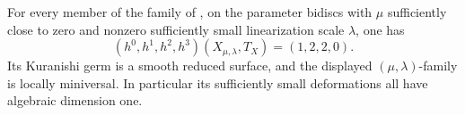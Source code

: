 \begin{proposition}\hypertarget{tag-01GK}{}\label{cdp:st:E13}

For every member of the family of
\cite[Proposition labelled \texttt{family}]{Viaclovsky2026Two}, on the parameter
bidiscs with $\mu$ sufficiently close to zero and nonzero sufficiently
small linearization scale $\lambda$, one has
\[
 (h^0,h^1,h^2,h^3)(X_{\mu,\lambda},T_X)=(1,2,2,0).
\]
Its Kuranishi germ is a smooth reduced surface, and the displayed
$(\mu,\lambda)$-family is locally miniversal. In particular its
sufficiently small deformations all have algebraic dimension one.
\end{proposition}


